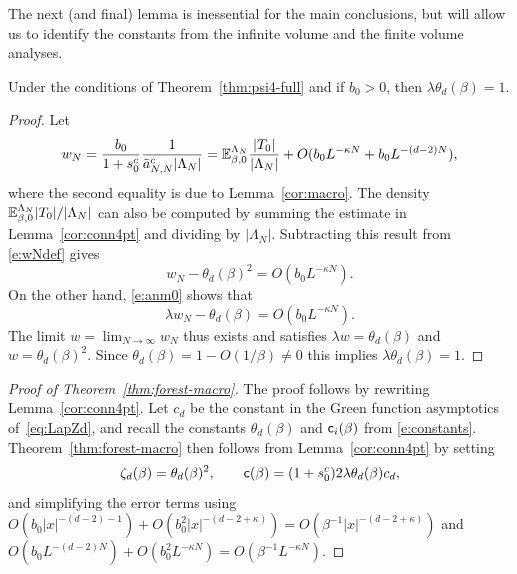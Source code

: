 \documentclass[11pt]{amsart}
\numberwithin{equation}{section}
\numberwithin{theorem}{section}
\newcommand{\1}{{\bf 1}}
\newcommand{\consto}{{\sf c}}
\newcommand{\clambda}{\lambda}
\begin{document}
The next (and final) lemma 
is inessential for the main conclusions, but will allow us to identify
the constants from the infinite volume and the finite volume analyses.

\begin{lemma} \label{cor:aNlimit}
  Under the conditions of Theorem~\ref{thm:psi4-full} and if $b_{0}>0$, then $\lambda \theta_d(\beta) = 1$.
\end{lemma}

\begin{proof}
  Let
  \begin{equation} \label{e:wNdef}
    w_{N} = \frac{b_{0}}{1+s^{c}_{0}} \frac{1}{\tilde a_{N,N}^{c}|\Lambda_{N}|}
    = \mathbb{E}^{\Lambda_N}_{\beta,0} \frac{|T_0|}{|\Lambda_N|}  + O(b_0L^{-\kappa N}+b_0L^{-(d-2)N}),
  \end{equation}
  where the second equality is due to Lemma~\ref{cor:macro}.
  The density $\mathbb{E}^{\Lambda_N}_{\beta,0} |T_0|/|\Lambda_N|$ can also be
  computed by summing the estimate in Lemma~\ref{cor:conn4pt} and dividing by $|\Lambda_N|$.
  Subtracting this result from \eqref{e:wNdef} gives
  \begin{equation}
    w_N-\theta_d(\beta)^2 
    =O(b_0L^{-\kappa N}).
          \label{e:r1}
  \end{equation}
  On the other hand, \eqref{e:anm0} shows that
  \begin{equation}
   \label{e:sys0}
   \clambda w_N  
   -\theta_d(\beta)
   = O(b_0L^{-\kappa N}).
  \end{equation}
  The limit $w= \lim_{N\to\infty} w_N$ thus exists and satisfies
  $\clambda w = \theta_d(\beta)$ and $w=\theta_d(\beta)^2$.
  Since $\theta_d(\beta)=1- O(1/\beta)\neq 0$
  this implies $\lambda \theta_d(\beta) = 1$.
\end{proof}

\begin{proof}[Proof of Theorem~\ref{thm:forest-macro}]
  The proof follows by rewriting Lemma~\ref{cor:conn4pt}. 
  Let  $c_d$ be the constant in the Green function asymptotics
  of~\eqref{eq:LapZd},
  and recall the constants $\theta_d(\beta)$ and ${\sf c}_i(\beta)$ from \eqref{e:constants}.
  Theorem~\ref{thm:forest-macro} then follows from Lemma~\ref{cor:conn4pt} by setting
  \begin{equation}
    \zeta_d(\beta)
    = \theta_d(\beta)^2, \qquad
      \consto(\beta)
      =(1+s_{0}^{c})2\clambda \theta_{d}(\beta) c_d,
  \end{equation}
  and simplifying the error terms using
  $O(b_0|x|^{-(d-2)-1})+O(b_0^2 |x|^{-(d-2+\kappa)}) = O(\beta^{-1}|x|^{-(d-2+\kappa)})$ and
  $O(b_0L^{-(d-2)N})+O(b_0^2 L^{-\kappa N}) = O(\beta^{-1}L^{-\kappa N})$.
\end{proof}
\end{document}
